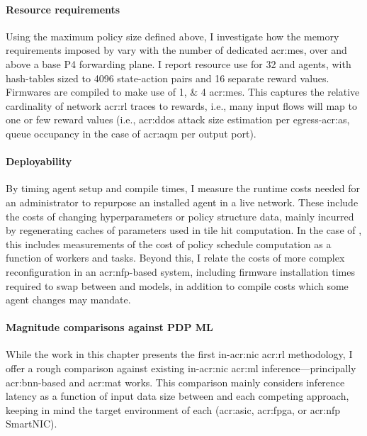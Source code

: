 \paragraph{Resource requirements}
Using the maximum policy size defined above, I investigate how the memory requirements imposed by \approachshort{} vary with the number of dedicated \glspl{acr:me}, over and above a base P4 forwarding plane.
I report resource use for \qty{32}{\bit} \Indfw{} and \Coopfw{} agents, with hash-tables sized to \num{4096} state-action pairs and \num{16} separate reward values.
Firmwares are compiled to make use of \numlist{1;4} \glspl{acr:me}.
This captures the relative cardinality of network \gls{acr:rl} traces to rewards, i.e., many input flows will map to one or few reward values (i.e., \gls{acr:ddos} attack size estimation per egress-\gls{acr:as}, queue occupancy in the case of \gls{acr:aqm} per output port).


\paragraph{Deployability}
By timing agent setup and compile times, I measure the runtime costs needed for an administrator to repurpose an installed agent in a live network.
These include the costs of changing hyperparameters or policy structure data, mainly incurred by regenerating caches of parameters used in tile hit computation.
In the case of \coopfw{}, this includes measurements of the cost of policy schedule computation as a function of workers and tasks.
Beyond this, I relate the costs of more complex reconfiguration in an \gls{acr:nfp}-based system, including firmware installation times required to swap between \coopfw{} and \indfw{} models, in addition to compile costs which some agent changes may mandate.

\paragraph{Magnitude comparisons against PDP ML}
While the work in this chapter presents the first in-\gls{acr:nic} \gls{acr:rl} methodology, I offer a rough comparison against existing in-\gls{acr:nic} \gls{acr:ml} inference---principally \gls{acr:bnn}-based and \gls{acr:mat} works.
This comparison mainly considers inference latency as a function of input data size between \approachshort{} and each competing approach, keeping in mind the target environment of each (\gls{acr:asic}, \gls{acr:fpga}, or \gls{acr:nfp} SmartNIC).
